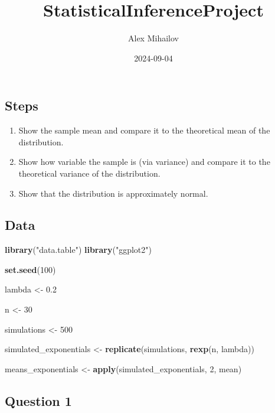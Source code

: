 \documentclass[
]{article}
\title{StatisticalInferenceProject}
\author{Alex Mihailov}
\date{2024-09-04}
\newenvironment{Shaded}{\begin{snugshade}}{\end{snugshade}}
\newcommand{\DecValTok}[1]{\textcolor[rgb]{0.00,0.00,0.81}{#1}}
\newcommand{\FloatTok}[1]{\textcolor[rgb]{0.00,0.00,0.81}{#1}}
\newcommand{\FunctionTok}[1]{\textcolor[rgb]{0.13,0.29,0.53}{\textbf{#1}}}
\newcommand{\NormalTok}[1]{#1}
\newcommand{\OtherTok}[1]{\textcolor[rgb]{0.56,0.35,0.01}{#1}}
\newcommand{\StringTok}[1]{\textcolor[rgb]{0.31,0.60,0.02}{#1}}
\providecommand{\tightlist}{%
  \setlength{\itemsep}{0pt}\setlength{\parskip}{0pt}}
\begin{document}
\maketitle

\subsection{Steps}\label{steps}

\begin{enumerate}
\def\labelenumi{\arabic{enumi}.}
\tightlist
\item
  Show the sample mean and compare it to the theoretical mean of the
  distribution.
\item
  Show how variable the sample is (via variance) and compare it to the
  theoretical variance of the distribution.
\item
  Show that the distribution is approximately normal.
\end{enumerate}

\subsection{Data}\label{data}

\begin{Shaded}
\begin{Highlighting}[]
\FunctionTok{library}\NormalTok{(}\StringTok{"data.table"}\NormalTok{)}
\FunctionTok{library}\NormalTok{(}\StringTok{"ggplot2"}\NormalTok{)}

\FunctionTok{set.seed}\NormalTok{(}\DecValTok{100}\NormalTok{)}

\NormalTok{lambda }\OtherTok{\textless{}{-}} \FloatTok{0.2}

\NormalTok{n }\OtherTok{\textless{}{-}} \DecValTok{30}

\NormalTok{simulations }\OtherTok{\textless{}{-}} \DecValTok{500}

\NormalTok{simulated\_exponentials }\OtherTok{\textless{}{-}} \FunctionTok{replicate}\NormalTok{(simulations, }\FunctionTok{rexp}\NormalTok{(n, lambda))}

\NormalTok{means\_exponentials }\OtherTok{\textless{}{-}} \FunctionTok{apply}\NormalTok{(simulated\_exponentials, }\DecValTok{2}\NormalTok{, mean)}
\end{Highlighting}
\end{Shaded}

\subsection{Question 1}\label{question-1}
\end{document}
